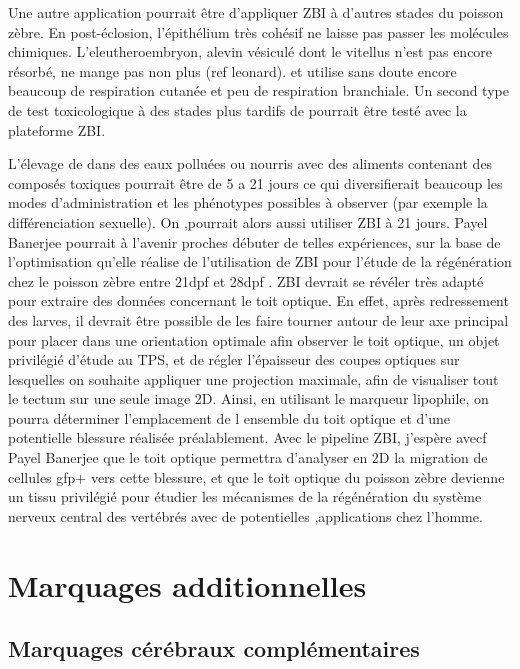 \documentclass[\main/main.tex]{subfiles}
\begin{document}
Une autre application pourrait être d'appliquer ZBI à  d'autres stades du poisson zèbre.  En post-éclosion, l'épithélium très cohésif ne laisse pas passer les molécules chimiques. L'eleutheroembryon, alevin vésiculé dont le vitellus n'est pas encore résorbé, ne mange pas non plus (ref leonard). et utilise sans doute encore beaucoup de respiration cutanée et peu de respiration branchiale. Un second type de test toxicologique à des stades plus tardifs de \pz{} pourrait être testé avec la plateforme ZBI.

L'élevage de \pz{} dans des eaux polluées ou nourris avec des  aliments contenant des composés toxiques pourrait être de 5 a 21 jours ce qui diversifierait beaucoup les modes d'administration et les phénotypes possibles à observer (par exemple la différenciation sexuelle). On ,pourrait alors aussi utiliser ZBI à 21 jours. Payel Banerjee pourrait à l'avenir proches débuter de telles expériences, sur la base de l'optimisation qu'elle réalise de l'utilisation de ZBI pour l'étude de la régénération chez le poisson zèbre entre 21dpf et 28dpf . ZBI devrait se révéler très adapté pour extraire des données concernant le toit optique. En effet, après redressement des larves, il devrait être possible de les faire tourner autour de leur axe principal pour placer dans une orientation optimale afin observer le toit optique, un objet privilégié d'étude au TPS, et de régler l'épaisseur des coupes optiques sur lesquelles on souhaite appliquer une projection maximale, afin de visualiser tout le tectum sur une seule image 2D. Ainsi, en utilisant le marqueur lipophile, on pourra déterminer l'emplacement de l ensemble du toit optique et d'une potentielle blessure réalisée préalablement. Avec le pipeline ZBI, j'espère avecf Payel Banerjee que le toit optique permettra d'analyser en 2D la migration de cellules gfp+ vers cette blessure, et que le toit optique du poisson zèbre devienne un tissu privilégié pour étudier les mécanismes de la régénération du système nerveux central des vertébrés avec de potentielles ,applications chez l'homme.

\section{Marquages additionnelles}
\label{sec:label}

    \subsection{Marquages cérébraux complémentaires}
   
\end{document}
